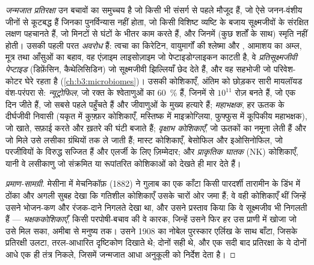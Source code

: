 \begin{definition}[जन्मजात प्रतिरक्षा]\label{def:b3:innate-immunity:innate}
\emph{जन्मजात प्रतिरक्षा} उन बचावों का समुच्चय है जो किसी भी संसर्ग से
पहले मौजूद हैं, जो ऐसे जनन-वंशीय जीनों से कूटबद्ध हैं जिनका पुनर्विन्यास
नहीं होता, जो किसी विशिष्ट व्यष्टि के बजाय सूक्ष्मजीवों के संरक्षित
लक्षण पहचानते हैं, जो मिनटों से घंटों के भीतर काम करते हैं, और जिनमें
(कुछ शर्तों के साथ) स्मृति नहीं होती। उसकी पहली परत \emph{अवरोध} हैं:
त्वचा का किरेटिन, वायुमार्गों की श्लेष्मा और , आमाशय का अम्ल,
मूत्र तथा आँसुओं का बहाव, वह एंज़ाइम लाइसोज़ाइम जो पेप्टाइडोग्लाइकन
काटती है, वे \emph{प्रतिसूक्ष्मजीवी पेप्टाइड} (डिफ़ेंसिन, कैथेलिसिडिन)
जो सूक्ष्मजीवी झिल्लियाँ छेद देते हैं, और वह सहभोजी  जो
परिवेश-कोटर घेरे रहता है (\cref{ch:b3:microbiomes})। उसकी कोशिकाएँ,
अंतिम को छोड़कर सारी मायलॉयड वंश-परंपरा से: \emph{न्यूट्रोफिल}, जो रक्त
के श्वेताणुओं का \qty{60}{\%} हैं, जिनमें से $10^{11}$ रोज़ बनते हैं,
जो एक दिन जीते हैं, जो सबसे पहले पहुँचते हैं और जीवाणुओं के मुख्य हत्यारे
हैं; \emph{महाभक्षक}, हर ऊतक के दीर्घजीवी निवासी (यकृत में कुफ़्फ़र
कोशिकाएँ, मस्तिष्क में माइक्रोग्लिया, फुफ्फुस में कूपिकीय महाभक्षक),
जो खाते, सफ़ाई करते और ख़तरे की घंटी बजाते हैं; \emph{वृक्षाभ
कोशिकाएँ}, जो ऊतकों का नमूना लेती हैं और जो मिले उसे लसीका ग्रंथियों तक
ले जाती हैं; मास्ट कोशिकाएँ, बेसोफिल और इओसिनोफिल, जो परजीवियों के
विरुद्ध सज्जित हैं और एलर्जी के लिए ज़िम्मेदार; और \emph{प्राकृतिक
घातक} (NK) कोशिकाएँ, यानी वे लसीकाणु जो संक्रमित या रूपांतरित कोशिकाओं
को देखते ही मार देते हैं।
\end{definition}

\begin{proof}[प्रमाण-सामग्री]
मेसीना में मेचनिकॉफ़ (1882) ने गुलाब का एक काँटा किसी पारदर्शी तारामीन
के डिंभ में ठोंका और अगली सुबह देखा कि गतिशील कोशिकाएँ उसके चारों ओर
जमा हैं; वे वही कोशिकाएँ थीं जिन्हें उसने भोजन-कण और रंजक-दाने निगलते
देखा था, और उसने प्रस्ताव किया कि वे सूक्ष्मजीव भी निगलती हैं ---
\emph{भक्षककोशिकाएँ}, किसी परपोषी-बचाव की वे कारक, जिन्हें उसने फिर हर
उस प्राणी में खोजा जो उसे मिल सका, अमीबा से मनुष्य तक। उसने 1908 का
नोबेल पुरस्कार एर्लिख के साथ बाँटा, जिसके प्रतिरक्षी उलटा, तरल-आधारित
दृष्टिकोण दिखाते थे; दोनों सही थे, और एक सदी बाद प्रतिरक्षा के ये दोनों
आधे एक ही तंत्र निकले, जिसमें जन्मजात आधा अनुकूली को निर्देश देता है।
\end{proof}

